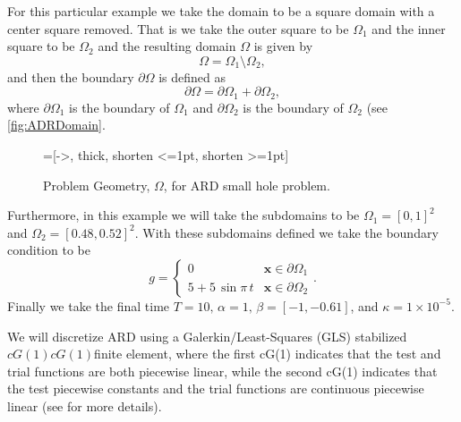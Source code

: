     For this particular example we take the domain to be a square domain with a
    center square removed. That is we take the outer square to be $\Omega_1$ and
    the inner square to be $\Omega_2$ and the resulting domain $\Omega$ is given
    by
    \begin{equation}
        \Omega = \Omega_1\setminus \Omega_2,
        \label{eq:ADRDomain}
    \end{equation}
    and then the boundary $\partial \Omega$ is defined as
    \begin{equation}
        \partial \Omega = \partial \Omega_1 + \partial \Omega_2,
        \label{eq:ADRBoundary}
    \end{equation}
    where $\partial \Omega_1$ is the boundary of $\Omega_1$ and $\partial
    \Omega_2$ is the boundary of $\Omega_2$ (see \autoref{fig:ADRDomain}.

    \begin{figure}[h]
        \centering
        =[->, thick, shorten <=1pt, shorten >=1pt]
        \caption{Problem Geometry, $\Omega$, for ARD small hole problem.}
        \label{fig:ADRDomain}
    \end{figure}

    Furthermore, in this example we will take the subdomains to be $\Omega_1 =
    [0,1]^2$ and $\Omega_2 = [0.48,0.52]^2$. With these subdomains defined we
    take the boundary condition to be
    \begin{equation}
        g = \begin{cases}
            0   &\mathbf{x} \in \partial \Omega_1 \\
            5 + 5\, \sin \pi\, t  &\mathbf{x} \in \partial \Omega_2
        \end{cases}.
        \label{eq:ADRBCs}
    \end{equation}
    Finally we take the final time $T=10,\, \alpha=1,\, \beta = \left[ -1,
    -0.61 \right]$, and $\kappa = 1\times10^{-5}$.

    We will discretize ARD using a Galerkin\slash Least-Squares (GLS) stabilized
    $cG(1)cG(1)$finite element, where the first cG(1) indicates that the test and
    trial functions are both piecewise linear, while the second cG(1) indicates
    that the test piecewise constants and the trial functions are continuous
    piecewise linear (see \cite{Hoffman2006a} for more details).

